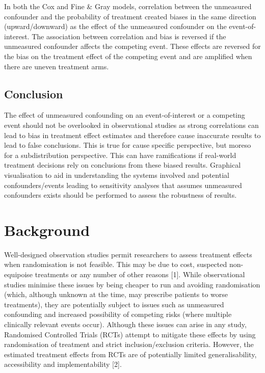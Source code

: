 \documentclass[12pt,PhD,twoside,openright]{muthesis}
\begin{document}
In both the Cox and Fine \& Gray models, correlation between the unmeasured confounder and the probability of treatment created biases in the same direction (upward/downward) as the effect of the unmeasured confounder on the event-of-interest. The association between correlation and bias is reversed if the unmeasured confounder affects the competing event. These effects are reversed for the bias on the treatment effect of the competing event and are amplified when there are uneven treatment arms.

\hypertarget{conclusion}{%
\subsection{Conclusion}\label{conclusion}}

The effect of unmeasured confounding on an event-of-interest or a competing event should not be overlooked in observational studies as strong correlations can lead to bias in treatment effect estimates and therefore cause inaccurate results to lead to false conclusions. This is true for cause specific perspective, but moreso for a subdistribution perspective. This can have ramifications if real-world treatment decisions rely on conclusions from these biased results. Graphical visualisation to aid in understanding the systems involved and potential confounders/events leading to sensitivity analyses that assumes unmeasured confounders exists should be performed to assess the robustness of results.

\hypertarget{background-1}{%
\section{Background}\label{background-1}}

Well-designed observation studies permit researchers to assess treatment effects when randomisation is not feasible. This may be due to cost, suspected non-equipoise treatments or any number of other reasons {[}1{]}. While observational studies minimise these issues by being cheaper to run and avoiding randomisation (which, although unknown at the time, may prescribe patients to worse treatments), they are potentially subject to issues such as unmeasured confounding and increased possibility of competing risks (where multiple clinically relevant events occur). Although these issues can arise in any study, Randomised Controlled Trials (RCTs) attempt to mitigate these effects by using randomisation of treatment and strict inclusion/exclusion criteria. However, the estimated treatment effects from RCTs are of potentially limited generalisability, accessibility and implementability {[}2{]}.
\end{document}
